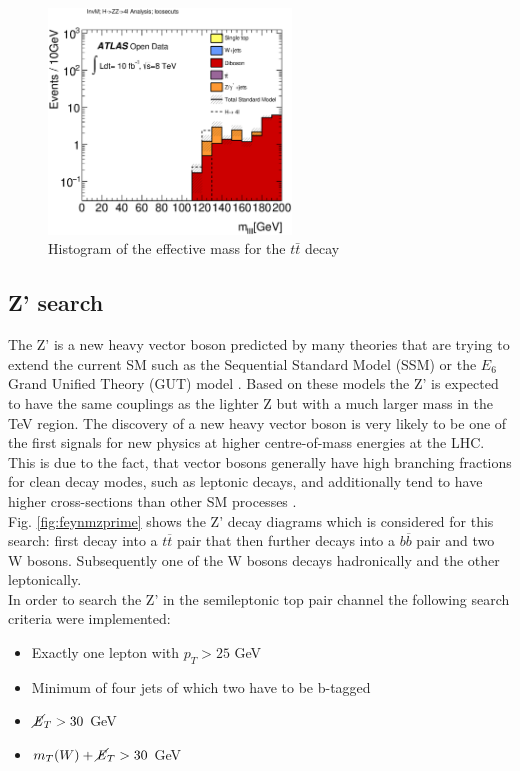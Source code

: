 \documentclass[runningheads,a4paper]{llncs}
\begin{document}
\begin{figure}[H]
\centering
\includegraphics[height=6cm]{higgs_m34conefinal}
\caption{Histogram of the effective mass for the $t \bar{t}$ decay}
\label{fig:finalhiggs}
\end{figure}
\subsection{Z' search}
The Z' is a new heavy vector boson predicted by many theories that are trying to extend the current SM such as the Sequential Standard Model (SSM) or the ${E}_{6}$ Grand Unified Theory (GUT) model \cite{hayden2013z}. Based on these models the Z' is expected to have the same couplings as the lighter Z but with a much larger mass in the TeV region. The discovery of a new heavy vector boson is very likely to be one of the first signals for new physics at higher centre-of-mass energies at the LHC. This is due to the fact, that vector bosons generally have high branching fractions for clean decay modes, such as leptonic decays, and additionally tend to have higher cross-sections than other SM processes \cite{hayden2013z}.\\

Fig. \ref{fig:feynmzprime} shows the Z' decay diagrams which is considered for this search: first decay into a $t$$\overline t$ pair that then further decays into a $b$$\overline b$ pair and two W bosons. Subsequently one of the W bosons decays hadronically and the other leptonically.\\

In order to search the Z' in the semileptonic top pair channel the following search criteria were implemented:
\begin{itemize}
\item Exactly one lepton with ${p}_{T} > 25$ GeV
\item Minimum of four jets of which two have to be b-tagged
\item $\cancel{\it{E}}_{T} > 30$ GeV 
\item ${m}_{T}(W) + \cancel{\it{E}}_{T} > 30$ GeV
\end{itemize}
\end{document}

